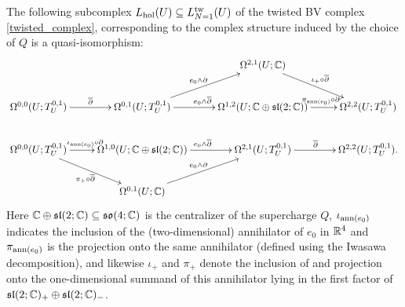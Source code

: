\documentclass[10pt, oneside]{article}
\begin{document}
\begin{prop}
The following subcomplex $L_{\mathrm{hol}}(U) \subseteq L_{N=1}^{\mathrm{tw}}(U)$ of the twisted BV complex \ref{twisted_complex}, corresponding to the complex structure induced by the choice of $Q$ is a quasi-isomorphism:
\begin{equation}\xymatrix{
&&\Omega^{2,1}(U;\CC) \ar[dr]^{\iota_+ \circ \ol \dd} & \\
\Omega^{0,0}(U; T^{0,1}_U) \ar[r]^{\ol \dd} &\Omega^{0,1}(U; T^{0,1}_U) \ar[ur]^{e_0 \wedge \dd} \ar[r]^{e_0 \wedge \ol \dd} &\Omega^{1,2}(U; \CC \oplus \sl(2;\CC)) \ar[r]^(.55){\pi_{\mr{ann}(e_0)} \circ \dd} &\Omega^{2,2}(U;T^{0,1}_U)\\
\Omega^{0,0}(U;T^{0,1}_U) \ar[dr]_{\pi_+ \circ \ol \dd} \ar[r]^(.45){\iota_{\mr{ann}(e_0)} \circ \dd}&\Omega^{1,0}(U; \CC \oplus \sl(2;\CC)) \ar[r]^{e_0 \wedge \ol \dd} &\Omega^{2,1}(U; T^{0,1}_U) \ar[r]^{\ol \dd} &\Omega^{2,2}(U;T^{0,1}_U).\\
&\Omega^{0,1}(U;\CC) \ar[ur]^{e_0 \wedge \dd} &&
}\label{small_model}\end{equation}
Here $\mathbb{C} \oplus \mathfrak{sl}(2;\mathbb{C}) \subseteq \mathfrak{so}(4;\mathbb{C})$ is the centralizer of the supercharge $Q$, $\iota_{\mathrm{ann}(e_0)}$ indicates the inclusion of the (two-dimensional) annihilator of $e_0$ in $\mathbb{R}^4$ and $\pi_{\mathrm{ann}(e_0)}$ is the projection onto the same annihilator (defined using the Iwasawa decomposition), and likewise $\iota_+$ and $\pi_+$ denote the inclusion of and projection onto the one-dimensional summand of this annihilator lying in the first factor of $\mathfrak{sl}(2;\mathbb{C})_+ \oplus \mathfrak{sl}(2;\mathbb{C})_-$.  
\end{prop}
\end{document}
